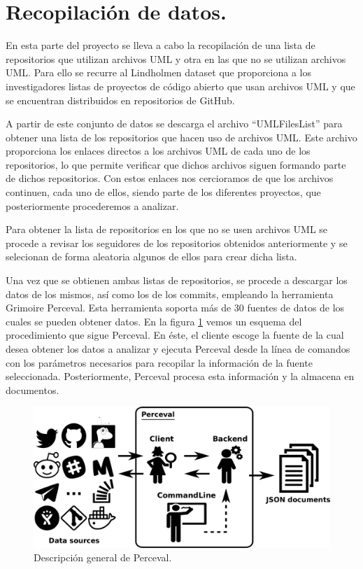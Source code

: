 \documentclass[a4paper, 12pt]{book}
\begin{document}
\section{Recopilación de datos.} %
\label{sec:recopilación de datos}

En esta parte del proyecto se lleva a cabo la recopilación de una lista de repositorios que utilizan archivos UML y otra en las que no se utilizan archivos UML.
Para ello se recurre al Lindholmen dataset que proporciona a los investigadores listas de proyectos de código abierto que usan archivos UML y que se encuentran distribuidos en repositorios de GitHub.

A partir de este conjunto de datos se descarga el archivo ``UMLFilesList'' para obtener una lista de los repositorios que hacen uso de archivos UML.
Este archivo proporciona los enlaces directos a los archivos UML de cada uno de los repositorios, lo que permite verificar que dichos archivos siguen formando parte de dichos repositorios.
Con estos enlaces nos cercioramos de que los archivos continuen, cada uno de ellos, siendo parte de los diferentes proyectos, que posteriormente procederemos a analizar. 


Para obtener la lista de repositorios en los que no se usen archivos UML se procede a revisar los seguidores de los repositorios obtenidos anteriormente y se selecionan de forma aleatoria algunos de ellos para crear dicha lista.


Una vez que se obtienen ambas listas de repositorios, se procede a descargar los datos de los mismos, así como los de los commits, empleando la herramienta Grimoire Perceval.
Esta herramienta soporta más de 30 fuentes de datos de los cuales se pueden obtener datos.
En la figura \ref{fig:perceval-json} vemos un esquema del procedimiento que sigue Perceval. 
En éste, el cliente escoge la fuente de la cual desea obtener los datos a analizar y ejecuta Perceval desde la línea de comandos con los parámetros necesarios para recopilar la información de la fuente seleccionada.
Posteriormente, Perceval procesa esta información y la almacena en documentos. 

\begin{figure}
  \centering
  \includegraphics[width=12cm, keepaspectratio]{img/perceval-json.png}
  \caption{Descripción general de Perceval.}\label{fig:perceval-json}
\end{figure}
\end{document}
